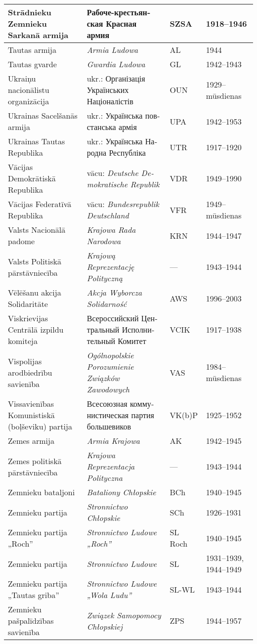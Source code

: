 \documentclass[twoside,a5paper,12pt,fleqn,openany]{extbook}
\newcommand{\pltxti}[1]{\textit{\textpolish{#1}}}
\newcommand{\rutxti}[1]{\textrussian{#1}}
\newcommand{\detxti}[1]{\textit{\textgerman{#1}}}
\newcommand{\uktxti}[1]{\textukrainian{#1}}
\begin{document}
\begin{footnotesize}
\begin{tabularx}{\linewidth}{|p{3cm}|p{3.5cm}|p{1.4cm}|p{1.6cm}|}
\hline
Strādnieku Zemnieku Sarkanā armija & \rutxti{Рабоче-крестьянская Красная армия} & SZSA & 1918--1946 \\
\hline
Tautas armija & \pltxti{Armia Ludowa} & AL & 1944 \\
\hline
Tautas gvarde & \pltxti{Gwardia Ludowa} & GL & 1942--1943 \\
\hline
Ukraiņu nacionālistu organizācija & ukr.: \uktxti{Організація Українських Націоналістів} & OUN & 1929--mūsdienas \\
\hline
Ukrainas Sacelšanās armija & ukr.: \uktxti{Українська повстанська армія} & UPA & 1942--1953 \\
\hline
Ukrainas Tautas Republika & ukr.: \uktxti{Українська Народна Республіка} & UTR & 1917--1920 \\
\hline
Vācijas Demokrātiskā Republika & vācu: \detxti{Deutsche Demokratische Republik} & VDR & 1949--1990 \\
\hline
Vācijas Federatīvā Republika & vācu: \detxti{Bundesrepublik Deutschland} & VFR & 1949--mūsdienas \\
\hline
Valsts Nacionālā padome & \pltxti{Krajowa Rada Narodowa} & KRN & 1944--1947 \\
\hline
Valsts Politiskā pārstāvniecība & \pltxti{Krajową Reprezentację Polityczną} & --- & 1943--1944 \\
\hline
Vēlēšanu akcija Solidaritāte & \pltxti{Akcja Wyborcza Solidarność} & AWS & 1996--2003 \\
\hline
Viskrievijas Centrālā izpildu komiteja & \rutxti{Всероссийский Центральный Исполнительный Комитет} & VCIK & 1917--1938 \\
\hline
Vispolijas arodbiedrību savienība & \pltxti{Ogólnopolskie Porozumienie Związków Zawodowych} & VAS & 1984--mūsdienas \\
\hline
Vissavienības Komunistiskā (boļševiku) partija & \rutxti{Всесоюзная коммунистическая партия большевиков} & VK(b)P & 1925--1952 \\
\hline
Zemes armija & \pltxti{Armia Krajowa} & AK & 1942--1945 \\
\hline
Zemes politiskā pārstāvniecība & \pltxti{Krajowa Reprezentacja Polityczna} & --- & 1943--1944 \\
\hline
Zemnieku bataljoni & \pltxti{Bataliony Chłopskie} & BCh & 1940--1945 \\
\hline
Zemnieku partija & \pltxti{Stronnictwo Chłopskie} & SCh & 1926--1931 \\
\hline
Zemnieku partija „Roch” & \pltxti{Stronnictwo Ludowe „Roch”} & SL Roch & 1940--1945 \\
\hline
Zemnieku partija & \pltxti{Stronnictwo Ludowe} & SL & 1931--1939, 1944--1949 \\
\hline
Zemnieku partija „Tautas griba” & \pltxti{Stronnictwo Ludowe „Wola Ludu”} & SL-WL & 1943--1944 \\
\hline
Zemnieku pašpalīdzības savienība & \pltxti{Związek Samopomocy Chłopskiej} & ZPS & 1944--1957 \\
\hline
\end{tabularx}
\end{footnotesize}
\end{document}
